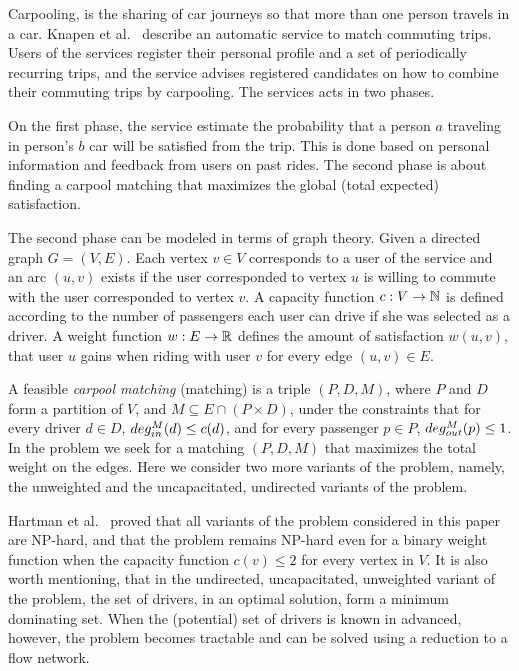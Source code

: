 Carpooling, is the sharing of car journeys so that more than one person travels
in a car.
Knapen et al.~\cite{knapen2013estimating} describe an automatic service
to match commuting trips.
Users of the services register their personal profile and a set of periodically
recurring trips, 
and the service advises registered candidates on how to combine their commuting
trips by carpooling.
The services acts in two phases. 

On the first phase, the service estimate the probability that a person $a$
traveling in person's $b$ car will be satisfied from the trip.
This is done based on personal information and feedback from users on past
rides.
The second phase is about finding a carpool matching
that maximizes the global (total expected) satisfaction.

The second phase can be modeled in terms of graph theory.
Given a directed graph $G = (V, E)$.
Each vertex $v \in V$ corresponds to a user of the service and an arc
$(u, v)$ exists if the user corresponded to vertex $u$ is willing to
commute with the user corresponded to vertex $v$.
A capacity function $ c: V \rightarrow \mathbb{N} $ is defined
according to the number of passengers each user can drive if she was
selected as a driver.
A weight function $w : E \rightarrow \mathbb{R} $ defines the amount of
satisfaction $w(u, v)$,
that user $u$ gains when riding with user $v$ for every edge $(u, v) \in E$.

A feasible \emph{carpool matching} (matching) is a triple 
$(P, D, M)$, where $P$ and $D$ form a partition of $V$, and 
$M \subseteq E \cap (P \times D)$,
under the constraints that for every driver $d \in D$, 
$deg^M_{in}(d) \leq c(d)$, 
and for every passenger $p \in P$, $deg^M_{out}(p) \leq 1$.
In the \textsc{\CARPOOL{}} problem we seek for a matching $(P, D, M)$ that maximizes the
total weight on the edges.
Here we consider two more variants of the problem, namely, 
the unweighted and the uncapacitated, undirected variants of the problem.
  
Hartman et al.~\cite{hartman2013optimal} proved that all variants of the
\emph{\CARPOOL{}} problem considered in this paper are NP-hard,
and that the problem remains NP-hard even for a binary weight function when
the capacity function $c(v) \leq 2$ for every vertex in $V$.
It is also worth mentioning, that in the undirected, uncapacitated, unweighted
variant of the problem, the set of drivers, in an optimal solution,
form a minimum dominating set.
When the (potential) set of drivers is known in advanced, however, the problem becomes
tractable and can be solved using a reduction to a flow network.

